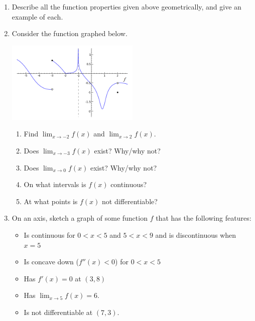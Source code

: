 \begin{enumerate}
  \item Describe all the function properties given above geometrically, and give an example of each.
  \item Consider the function graphed below.
        \begin{center}
          \includegraphics[width=0.5\textwidth]{limits3}
        \end{center}
    \begin{enumerate}
      \item Find $ \lim_{x \to -2} f(x) $ and $ \lim_{x \to 2} f(x) $.
      \item Does $ \lim_{x \to -3} f(x) $ exist? Why/why not?
      \item Does $ \lim_{x \to 0} f(x) $ exist? Why/why not?
      \item On what intervals is $ f(x) $ continuous?
      \item At what points is $ f(x) $ not differentiable?
    \end{enumerate}
  \item On an axis, sketch a graph of some function $ f $ that has the following features:
    \begin{itemize}[noitemsep]
      \item Is continuous for $ 0 < x < 5 $ and $ 5 < x < 9 $ and is discontinuous when $ x = 5 $
      \item Is concave down ($f''(x) < 0 $) for $ 0 < x < 5 $
      \item Has $ f'(x) = 0 $ at $ (3, 8) $
      \item Has $ \lim_{x \to 5} f(x) = 6 $.
      \item Is not differentiable at $ (7, 3) $.
    \end{itemize}
\end{enumerate}
